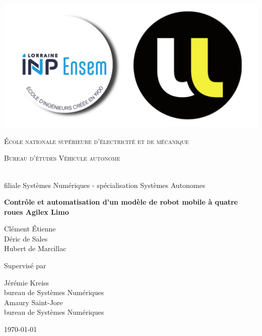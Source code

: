 \begin{titlepage}

\thispagestyle{empty}
\setlength\headheight{0pt} 
\begin{center}

\begin{center}
\includegraphics[width=0.40\linewidth]{img/ENSEM-logo.png}     

\end{center}	

        \vspace{0.25cm}
        {\scshape\LARGE École nationale supérieure d’électricité et de mécanique \par}
        \vspace{0.25cm}
        {\scshape\Large Bureau d'études Véhicule autonome\par} \\
        filiale Systèmes Numériques - spécialisation Systèmes Autonomes
        \vspace{0.5cm}

        {\Large\bfseries Contrôle et automatisation d'un modèle de robot mobile à quatre roues Agilex Limo\par}

        \vspace{1.5cm}
        \begin{doublespace}
        {\Large Clément Étienne} \\ 
        {\Large Déric de Sales} \\
        {\Large Hubert de Marcillac} \\
        
        \end{doublespace}
        \vspace{0.25cm}

\vspace{1cm}
Supervisé par\par
Jérémie Kreiss \\
bureau de Systèmes Numériques \\
Amaury Saint-Jore \\
bureau de Systèmes Numériques
\par
\vspace{3.0cm}
\large
\today

\end{center}

\clearpage
\restoregeometry
\end{titlepage}
